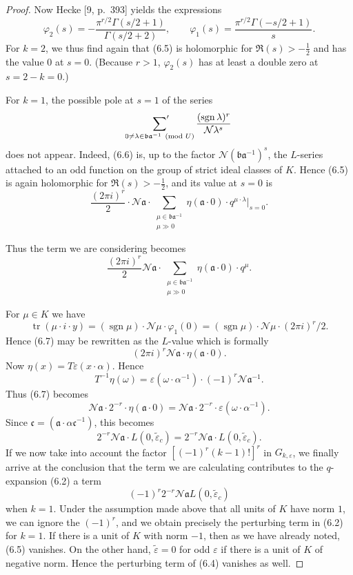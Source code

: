 \documentclass[12pt,a4paper]{article}
\theoremstyle{plain}
\theoremstyle{definition}
\theoremstyle{remark}
\DeclareMathOperator{\sgn}{sgn}
\DeclareMathOperator{\tr}{tr}
\begin{document}
\begin{proof}
Now Hecke [9, p.~393] yields the expressions
\[
\varphi_2(s) = -\frac{\pi^{r/2}\Gamma(s/2+1)}{\Gamma(s/2+2)}, \qquad \varphi_1(s) = \frac{\pi^{r/2}\Gamma(-s/2+1)}{s}.
\]
For $k=2$, we thus find again that (6.5) is holomorphic for $\Re(s) > -\frac{1}{2}$ and has the value $0$ at $s=0$. (Because $r > 1$, $\varphi_2(s)$ has at least a double zero at $s = 2-k = 0$.)

For $k=1$, the possible pole at $s=1$ of the series
\begin{equation}\label{eq:6.6}
\sideset{}{'}\sum_{0 \neq \lambda \in \mathfrak{b}\mathfrak{a}^{-1} \pmod{U}} \frac{(\sgn \lambda)^r}{\mathcal{N}\lambda^s}
\end{equation}
does not appear. Indeed, (6.6) is, up to the factor $\mathcal{N}(\mathfrak{b}\mathfrak{a}^{-1})^s$, the $L$-series attached to an odd function on the group of strict ideal classes of $K$. Hence (6.5) is again holomorphic for $\Re(s) > -\frac{1}{2}$, and its value at $s=0$ is
\[
\frac{(2\pi i)^r}{2} \cdot \mathcal{N}\mathfrak{a} \cdot \sum_{\substack{\mu \in \mathfrak{b}\mathfrak{a}^{-1} \\ \mu \gg 0}} \eta(\mathfrak{a} \cdot 0) \cdot q^{\mu \cdot \lambda} \Big|_{s=0}.
\]

Thus the term we are considering becomes
\begin{equation}\label{eq:6.7}
\frac{(2\pi i)^r}{2} \mathcal{N}\mathfrak{a} \cdot \sum_{\substack{\mu \in \mathfrak{b}\mathfrak{a}^{-1} \\ \mu \gg 0}} \eta(\mathfrak{a} \cdot 0) \cdot q^{\mu}.
\end{equation}

For $\mu \in K$ we have
\[
\tr(\mu \cdot i \cdot y) = (\sgn \mu) \cdot \mathcal{N}\mu \cdot \varphi_1(0) = (\sgn \mu) \cdot \mathcal{N}\mu \cdot (2\pi i)^r/2.
\]
Hence (6.7) may be rewritten as the $L$-value which is formally
\[
(2\pi i)^r \mathcal{N}\mathfrak{a} \cdot \eta(\mathfrak{a} \cdot 0).
\]
Now $\eta(x) = T\varepsilon(x \cdot \alpha)$. Hence
\[
T^{-1}\eta(\omega) = \varepsilon(\omega \cdot \alpha^{-1}) \cdot (-1)^r \mathcal{N}\mathfrak{a}^{-1}.
\]
Thus (6.7) becomes
\[
\mathcal{N}\mathfrak{a} \cdot 2^{-r} \cdot \eta(\mathfrak{a} \cdot 0) = \mathcal{N}\mathfrak{a} \cdot 2^{-r} \cdot \varepsilon(\omega \cdot \alpha^{-1}).
\]
Since $\mathfrak{c} = (\mathfrak{a} \cdot \alpha\mathfrak{c}^{-1})$, this becomes
\[
2^{-r} \mathcal{N}\mathfrak{a} \cdot L(0, \tilde{\varepsilon}_c) = 2^{-r} \mathcal{N}\mathfrak{a} \cdot L(0, \tilde{\varepsilon}_c).
\]
If we now take into account the factor $[(-1)^r(k-1)!]^r$ in $G_{k,\varepsilon}$, we finally arrive at the conclusion that the term we are calculating contributes to the $q$-expansion (6.2) a term
\[
(-1)^r 2^{-r} \mathcal{N}\mathfrak{a} L(0, \tilde{\varepsilon}_c)
\]
when $k=1$. Under the assumption made above that all units of $K$ have norm $1$, we can ignore the $(-1)^r$, and we obtain precisely the perturbing term in (6.2) for $k=1$. If there is a unit of $K$ with norm $-1$, then as we have already noted, (6.5) vanishes. On the other hand, $\tilde{\varepsilon} = 0$ for odd $\varepsilon$ if there is a unit of $K$ of negative norm. Hence the perturbing term of (6.4) vanishes as well.


\end{proof}
\end{document}
